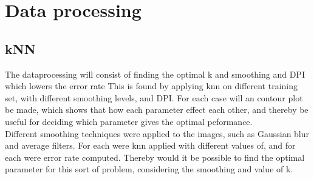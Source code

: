 \chapter{ Data processing}
\section{kNN}
The dataprocessing will consist of finding the optimal k and smoothing and
DPI which lowers the error rate  This is found by applying knn on different training set,
with different smoothing levels, and DPI. 
For each case will an contour plot be made,
which shows that how each parameter effect each other,
and thereby be useful for deciding which parameter gives the optimal peformance. \\

Different smoothing techniques were applied to the images, such as Gaussian blur and average filters.  
For each were knn applied with different values of, and for each were error rate computed. 
Thereby would it be possible to find the optimal parameter for this sort of problem,
considering the smoothing and value of k. 


